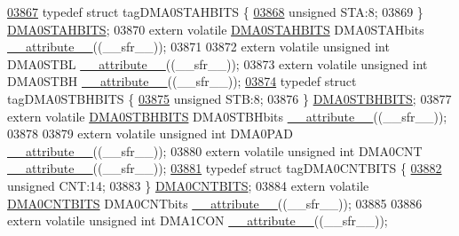 \begin{DoxyCode}
\hypertarget{a00009_source_l03867}{}\hyperlink{a00008}{03867} \textcolor{keyword}{typedef} \textcolor{keyword}{struct }tagDMA0STAHBITS \{
\hypertarget{a00009_source_l03868}{}\hyperlink{a00008_a0eec78ddd2c12af678d5fab70fe62d14}{03868}   \textcolor{keywordtype}{unsigned} STA:8;
03869 \} \hyperlink{a00008_d7/d93/a00397}{DMA0STAHBITS};
03870 \textcolor{keyword}{extern} \textcolor{keyword}{volatile} \hyperlink{a00008_d7/d93/a00397}{DMA0STAHBITS} DMA0STAHbits \hyperlink{a00009_a493c46f03454991ccc5aa7a6e1dfb2a7}{\_\_attribute\_\_}((\_\_sfr\_\_));
03871 
03872 \textcolor{keyword}{extern} \textcolor{keyword}{volatile} \textcolor{keywordtype}{unsigned} \textcolor{keywordtype}{int}  DMA0STBL \hyperlink{a00009_a493c46f03454991ccc5aa7a6e1dfb2a7}{\_\_attribute\_\_}((\_\_sfr\_\_));
03873 \textcolor{keyword}{extern} \textcolor{keyword}{volatile} \textcolor{keywordtype}{unsigned} \textcolor{keywordtype}{int}  DMA0STBH \hyperlink{a00009_a493c46f03454991ccc5aa7a6e1dfb2a7}{\_\_attribute\_\_}((\_\_sfr\_\_));
\hypertarget{a00009_source_l03874}{}\hyperlink{a00008}{03874} \textcolor{keyword}{typedef} \textcolor{keyword}{struct }tagDMA0STBHBITS \{
\hypertarget{a00009_source_l03875}{}\hyperlink{a00008_a9bd043a4db27e09b5035a563a8758fe7}{03875}   \textcolor{keywordtype}{unsigned} STB:8;
03876 \} \hyperlink{a00008_d9/dd1/a00398}{DMA0STBHBITS};
03877 \textcolor{keyword}{extern} \textcolor{keyword}{volatile} \hyperlink{a00008_d9/dd1/a00398}{DMA0STBHBITS} DMA0STBHbits \hyperlink{a00009_a493c46f03454991ccc5aa7a6e1dfb2a7}{\_\_attribute\_\_}((\_\_sfr\_\_));
03878 
03879 \textcolor{keyword}{extern} \textcolor{keyword}{volatile} \textcolor{keywordtype}{unsigned} \textcolor{keywordtype}{int}  DMA0PAD \hyperlink{a00009_a493c46f03454991ccc5aa7a6e1dfb2a7}{\_\_attribute\_\_}((\_\_sfr\_\_));
03880 \textcolor{keyword}{extern} \textcolor{keyword}{volatile} \textcolor{keywordtype}{unsigned} \textcolor{keywordtype}{int}  DMA0CNT \hyperlink{a00009_a493c46f03454991ccc5aa7a6e1dfb2a7}{\_\_attribute\_\_}((\_\_sfr\_\_));
\hypertarget{a00009_source_l03881}{}\hyperlink{a00008}{03881} \textcolor{keyword}{typedef} \textcolor{keyword}{struct }tagDMA0CNTBITS \{
\hypertarget{a00009_source_l03882}{}\hyperlink{a00008_a30be39d82c244f19fd98dd74227487f6}{03882}   \textcolor{keywordtype}{unsigned} CNT:14;
03883 \} \hyperlink{a00008_d9/d0a/a00390}{DMA0CNTBITS};
03884 \textcolor{keyword}{extern} \textcolor{keyword}{volatile} \hyperlink{a00008_d9/d0a/a00390}{DMA0CNTBITS} DMA0CNTbits \hyperlink{a00009_a493c46f03454991ccc5aa7a6e1dfb2a7}{\_\_attribute\_\_}((\_\_sfr\_\_));
03885 
03886 \textcolor{keyword}{extern} \textcolor{keyword}{volatile} \textcolor{keywordtype}{unsigned} \textcolor{keywordtype}{int}  DMA1CON \hyperlink{a00009_a493c46f03454991ccc5aa7a6e1dfb2a7}{\_\_attribute\_\_}((\_\_sfr\_\_));

\end{DoxyCode}
